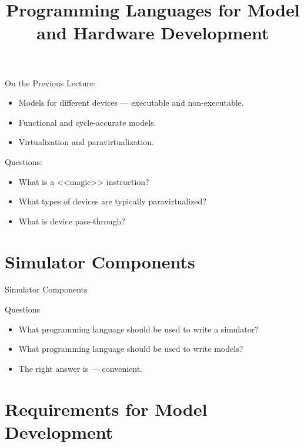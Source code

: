 
\title{Programming Languages for Model and Hardware Development}




\startslides

\begin{frame}{On the Previous Lecture:}
  \begin{itemize}
    \item Models for different devices --- executable and non-executable.
    \item Functional and cycle-accurate models.
    \item Virtualization and paravirtualization.
  \end{itemize}
\end{frame}

\begin{frame}{Questions:}
  \begin{itemize}
    \item What is a <<magic>> instruction? \pause
    \item What types of devices are typically paravirtualized? \pause
    \item What is device pass-through?
  \end{itemize}
\end{frame}

\section{Simulator Components}

\begin{frame}{Simulator Components}
  \centering
\end{frame}

\begin{frame}{Questions}
  \begin{itemize}
    \item What programming language should be used to write a simulator? \pause
    \item What programming language should be used to write models? \pause
    \item The right answer is --- convenient.
  \end{itemize}
\end{frame}

\section{Requirements for Model Development}

